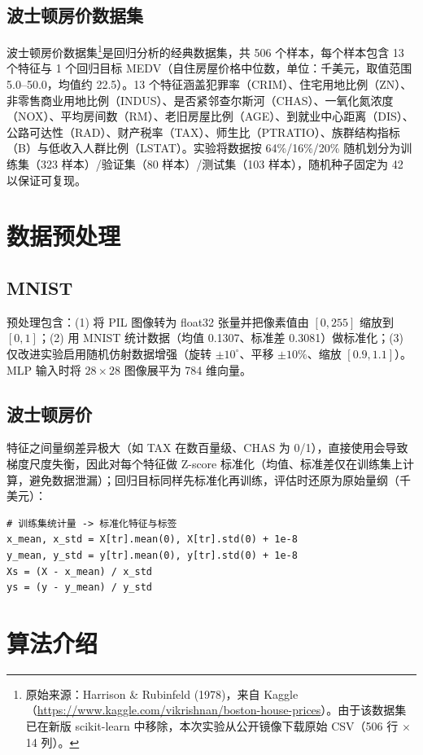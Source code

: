 \documentclass[UTF8,zihao=-4]{ctexart}
\begin{document}
\subsection{波士顿房价数据集}
波士顿房价数据集\footnote{原始来源：Harrison \& Rubinfeld (1978)，来自 Kaggle（\url{https://www.kaggle.com/vikrishnan/boston-house-prices}）。由于该数据集已在新版 scikit-learn 中移除，本次实验从公开镜像下载原始 CSV（506 行 $\times$ 14 列）。}是回归分析的经典数据集，共 506 个样本，每个样本包含 13 个特征与 1 个回归目标 MEDV（自住房屋价格中位数，单位：千美元，取值范围 5.0--50.0，均值约 22.5）。13 个特征涵盖犯罪率（CRIM）、住宅用地比例（ZN）、非零售商业用地比例（INDUS）、是否紧邻查尔斯河（CHAS）、一氧化氮浓度（NOX）、平均房间数（RM）、老旧房屋比例（AGE）、到就业中心距离（DIS）、公路可达性（RAD）、财产税率（TAX）、师生比（PTRATIO）、族群结构指标（B）与低收入人群比例（LSTAT）。实验将数据按 64\%/16\%/20\% 随机划分为训练集（323 样本）/验证集（80 样本）/测试集（103 样本），随机种子固定为 42 以保证可复现。

\section{数据预处理}
\subsection{MNIST}
预处理包含：(1) 将 PIL 图像转为 float32 张量并把像素值由 $[0,255]$ 缩放到 $[0,1]$；(2) 用 MNIST 统计数据（均值 0.1307、标准差 0.3081）做标准化；(3) 仅改进实验启用随机仿射数据增强（旋转 $\pm10^\circ$、平移 $\pm10\%$、缩放 $[0.9,1.1]$）。MLP 输入时将 $28\times28$ 图像展平为 784 维向量。

\subsection{波士顿房价}
特征之间量纲差异极大（如 TAX 在数百量级、CHAS 为 0/1），直接使用会导致梯度尺度失衡，因此对每个特征做 Z-score 标准化（均值、标准差仅在训练集上计算，避免数据泄漏）；回归目标同样先标准化再训练，评估时还原为原始量纲（千美元）：

\begin{lstlisting}
# 训练集统计量 -> 标准化特征与标签
x_mean, x_std = X[tr].mean(0), X[tr].std(0) + 1e-8
y_mean, y_std = y[tr].mean(0), y[tr].std(0) + 1e-8
Xs = (X - x_mean) / x_std
ys = (y - y_mean) / y_std
\end{lstlisting}

\section{算法介绍}
\end{document}

